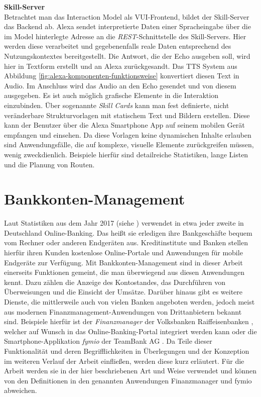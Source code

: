 \textbf{Skill-Server}\\
Betrachtet man das Interaction Model als \ac{VUI}-Frontend, bildet der Skill-Server das Backend ab. Alexa sendet interpretierte Daten einer Spracheingabe über die im Model hinterlegte Adresse an die \textit{\ac{REST}}-Schnittstelle des Skill-Servers. Hier werden diese verarbeitet und  gegebenenfalls reale Daten entsprechend des Nutzungskontextes bereitgestellt. Die Antwort, die der Echo ausgeben soll, wird hier in Textform erstellt und an Alexa zurückgesandt. Das \ac{TTS} System aus Abbildung \ref{fig:alexa-komponenten-funktionsweise} konvertiert diesen Text in Audio. Im Anschluss wird das Audio an den Echo gesendet und von diesem ausgegeben. Es ist auch möglich grafische Elemente in die Interaktion einzubinden. Über sogenannte \textit{Skill Cards} kann man fest definierte, nicht veränderbare Strukturvorlagen mit statischem Text und Bildern erstellen. Diese kann der Benutzer über die Alexa Smartphone App auf seinem mobilen Gerät empfangen und einsehen. Da diese Vorlagen keine dynamischen Inhalte erlauben sind Anwendungsfälle, die auf komplexe, visuelle Elemente zurückgreifen müssen, wenig zweckdienlich. Beispiele hierfür sind detailreiche Statistiken, lange Listen und die Planung von Routen.

\section{Bankkonten-Management}
\label{sec:bankkonten-management}
Laut Statistiken aus dem Jahr 2017 (siehe \cite{online-bank-statista} \cite{online-bank-heise} \cite{online-bank-destatis}) verwendet in etwa jeder zweite in Deutschland Online-Banking. Das heißt sie erledigen ihre Bankgeschäfte bequem vom Rechner oder anderen Endgeräten aus. Kreditinstitute und Banken stellen hierfür ihren Kunden kostenlose Online-Portale und Anwendungen für mobile Endgeräte zur Verfügung. Mit Bankkonten-Management sind in dieser Arbeit einerseits Funktionen gemeint, die man überwiegend aus diesen Anwendungen kennt. Dazu zählen \ua die Anzeige des Kontostandes, das Durchführen von Überweisungen und die Einsicht der Umsätze. Darüber hinaus gibt es weitere Dienste, die mittlerweile auch von vielen Banken angeboten werden, jedoch meist aus modernen Finanzmanagement-Anwendungen von Drittanbietern bekannt sind. Beispiele hierfür ist der \textit{Finanzmanager} der Volksbanken Raiffeisenbanken \cite{vrbank-finanzmanager}, welcher auf Wunsch in das Online-Banking-Portal integriert werden kann oder die Smartphone-Applikation \textit{fymio} der TeamBank AG \cite{fymio}. Da Teile dieser Funktionalität und deren Begrifflichkeiten in Überlegungen und der Konzeption im weiteren Verlauf der Arbeit einfließen, werden diese kurz erläutert. Für die Arbeit werden sie in der hier beschriebenen Art und Weise verwendet und können von den Definitionen in den genannten Anwendungen Finanzmanager und fymio abweichen.

